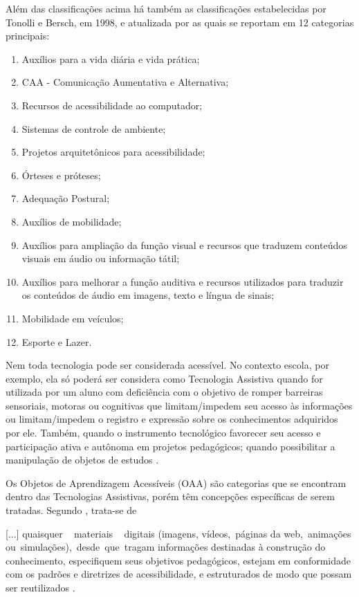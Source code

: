 \documentclass[portuguese]{textolivre}
\begin{document}
Além das classificações acima há também as classificações estabelecidas
por \textcite{tonolli1998}Tonolli e Bersch, em 1998, e atualizada por \textcite{bersch2017}as quais se reportam em 12 categorias principais:
\begin{enumerate}[label=\alph*)]
\item Auxílios para a vida diária e vida prática;
\item CAA - Comunicação Aumentativa e Alternativa;
\item Recursos de acessibilidade ao computador;
\item Sistemas de controle de ambiente;
\item Projetos arquitetônicos para acessibilidade;
\item Órteses e próteses;
\item Adequação Postural;
\item Auxílios de mobilidade;
\item Auxílios para ampliação da função visual e recursos que traduzem conteúdos visuais em áudio ou informação tátil;
\item Auxílios para melhorar a função auditiva e recursos utilizados para traduzir os conteúdos de áudio em imagens, texto e língua de sinais;
\item Mobilidade em veículos;
\item Esporte e Lazer.
\end{enumerate}

Nem toda tecnologia pode ser considerada acessível. No contexto escola,
por exemplo, ela só poderá ser considera como Tecnologia Assistiva
quando for utilizada por um aluno com deficiência com o objetivo de
romper barreiras sensoriais, motoras ou cognitivas que limitam/impedem
seu acesso às informações ou limitam/impedem o registro e expressão
sobre os conhecimentos adquiridos por ele. Também, quando o instrumento
tecnológico favorecer seu acesso e participação ativa e autônoma em
projetos pedagógicos; quando possibilitar a manipulação de objetos de
estudos \cite{bersch2013}.

Os Objetos de Aprendizagem Acessíveis
(OAA) são categorias que se encontram dentro das Tecnologias Assistivas,
porém têm concepções específicas de serem tratadas. Segundo \textcite{mourao2020}, trata-se de

{[}...{]} quaisquer ~ materiais ~
digitais (imagens, vídeos,~páginas da web,~animações
ou~simulações),~desde~que~tragam informações destinadas à construção do
conhecimento, especifiquem seus objetivos pedagógicos, estejam em
conformidade com os padrões e diretrizes de acessibilidade, e
estruturados de modo que possam ser reutilizados
\cite[p.~44]{mourao2020}.
\end{document}

